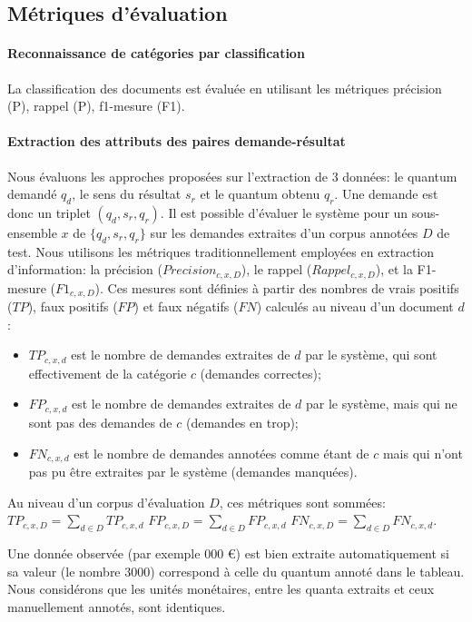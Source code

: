 \subsection{Métriques d'évaluation}
\paragraph{Reconnaissance de catégories par classification}

La classification des documents est évaluée en utilisant les métriques précision (P), rappel (P), f1-mesure (F1). %

\paragraph{Extraction des attributs des paires demande-résultat}
 Nous évaluons les approches proposées sur l'extraction de 3 données: le quantum demandé $q_d$, le sens du résultat $s_r$ et le quantum obtenu $q_r$. Une demande est donc un triplet $(q_d, s_r, q_r)$. Il est possible d'évaluer le système pour un sous-ensemble $x$ de $\lbrace q_d, s_r, q_r \rbrace$ sur les demandes extraites d'un corpus annotées $D$ de test. Nous utilisons les métriques traditionnellement employées en extraction d'information: la précision ($Precision_{c,x,D}$), le rappel ($Rappel_{c,x,D}$), et la F1-mesure ($F1_{c,x,D}$). Ces mesures sont définies à partir des nombres de vrais positifs ($TP$), faux positifs ($FP$) et faux négatifs ($FN$) calculés au niveau d'un document $d$:
\begin{itemize}
\item $TP_{c, x, d}$ est le nombre de demandes extraites de $d$ par le système, qui sont effectivement de la catégorie $c$ (demandes correctes);
\item $FP_{c, x, d}$ est le nombre de demandes extraites de $d$ par le système, mais qui ne sont pas des demandes de $c$ (demandes en trop);
\item $FN_{c, x, d}$ est le nombre de demandes annotées comme étant de $c$ mais qui n'ont pas pu être extraites par le système (demandes manquées).
\end{itemize}

Au niveau d'un corpus d'évaluation $D$, ces métriques sont sommées: 
$TP_{c,x,D} = \sum\limits_{d \in D} TP_{c,x,d}$ \hfill $FP_{c,x,D} = \sum\limits_{d \in D} FP_{c,x,d}$ \hfill $ FN_{c,x,D} = \sum\limits_{d \in D} FN_{c,x,d}$.

Une donnée observée (par exemple  000 \euro \fg) est bien extraite automatiquement si sa valeur (le nombre $3000$) correspond à celle du quantum annoté dans le tableau. Nous considérons que les unités monétaires, entre les quanta extraits et ceux manuellement annotés, sont identiques.

